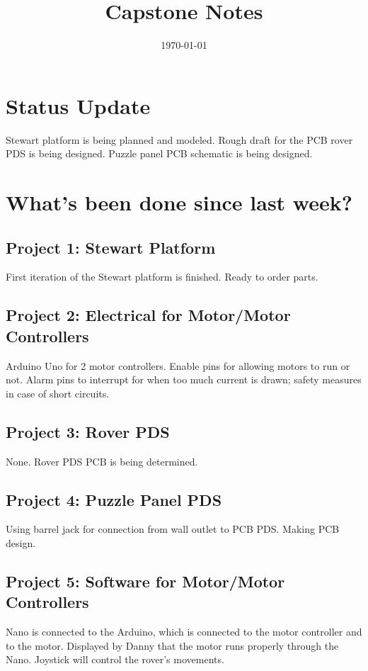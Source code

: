\documentclass[a4paper, 10pt]{article}
\title{Capstone Notes}
\date{\today}
\begin{document}
\maketitle

\section*{Status Update}

Stewart platform is being planned and modeled. Rough draft for the PCB rover PDS is being designed. Puzzle panel PCB schematic is being designed.

\section*{What's been done since last week?}
	\subsection*{Project 1: Stewart Platform}
	First iteration of the Stewart platform is finished. Ready to order parts. 
		
	\subsection*{Project 2: Electrical for Motor/Motor Controllers}
	Arduino Uno for 2 motor controllers. Enable pins for allowing motors to run or not. Alarm pins to interrupt for when too much current is drawn; safety measures in case of short circuits.
		
	\subsection*{Project 3: Rover PDS}	
	None. Rover PDS PCB is being determined.
		
	\subsection*{Project 4: Puzzle Panel PDS}
	Using barrel jack for connection from wall outlet to PCB PDS. Making PCB design. 
		
	\subsection*{Project 5: Software for Motor/Motor Controllers}
	Nano is connected to the Arduino, which is connected to the motor controller and to the motor. Displayed by Danny that the motor runs properly through the Nano. Joystick will control the rover's movements.
		
\end{document}
